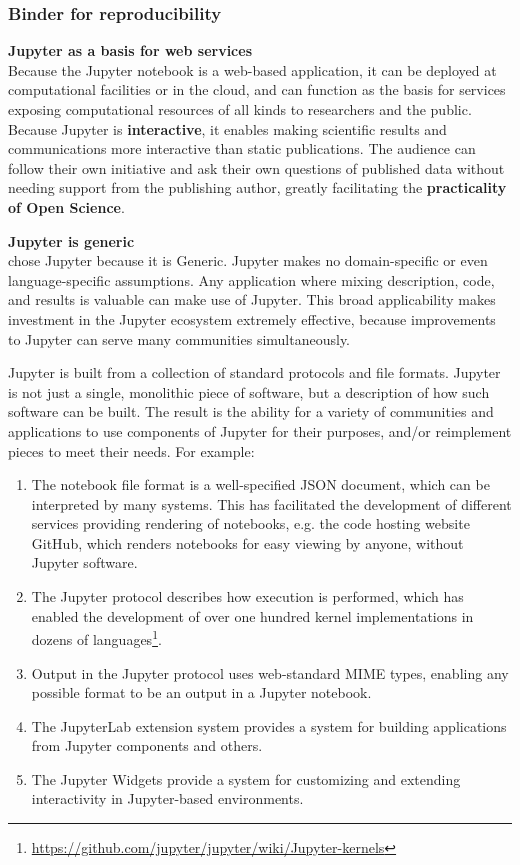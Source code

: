 \medskip
\subsubsection{Binder for reproducibility}\label{sec:binder-for-reproducibility}
\TOWRITE{}{}

\medskip
\noindent\textbf{Jupyter as a basis for web services}\\
Because the Jupyter notebook is a web-based application, it can be
deployed at computational facilities or in the cloud, and can function
as the basis for services exposing computational resources of all
kinds to researchers and the public.  Because Jupyter is
\textbf{interactive}, it enables making scientific results and
communications more interactive than static publications.  The
audience can follow their own initiative and ask their own questions
of published data without needing support from the publishing author,
greatly facilitating the \textbf{practicality of Open Science}.

\medskip
\noindent\textbf{Jupyter is generic}\\
\TheProject chose Jupyter because it is
Generic.  Jupyter makes no domain-specific or even language-specific
assumptions.  Any application where mixing description, code, and
results is valuable can make use of Jupyter.  This broad applicability
makes investment in the Jupyter ecosystem extremely effective, because
improvements to Jupyter can serve many communities simultaneously.

Jupyter is built from a collection of standard protocols and file
formats.  Jupyter is not just a single, monolithic piece of
software, but a description of how such software can be built.  The
result is the ability for a variety of communities and applications to
use components of Jupyter for their purposes, and/or reimplement pieces to
meet their needs.
%
For example:
\begin{enumerate}
\item The notebook file format is a well-specified JSON document,
  which can be interpreted by many systems.  This has facilitated the
  development of different services providing rendering of notebooks, e.g. the code
  hosting website GitHub, which renders notebooks for easy viewing by
  anyone, without Jupyter software.
\item The Jupyter protocol describes how execution is performed, which
  has enabled the development of over one hundred kernel
  implementations in dozens of languages\footnote{\url{https://github.com/jupyter/jupyter/wiki/Jupyter-kernels}}.
\item Output in the Jupyter protocol uses web-standard MIME types,
  enabling any possible format to be an output in a Jupyter notebook.
\item The JupyterLab extension system provides a system for building
  applications from Jupyter components and others.
\item The Jupyter Widgets provide a system for customizing and
  extending interactivity in Jupyter-based environments.
\end{enumerate}

